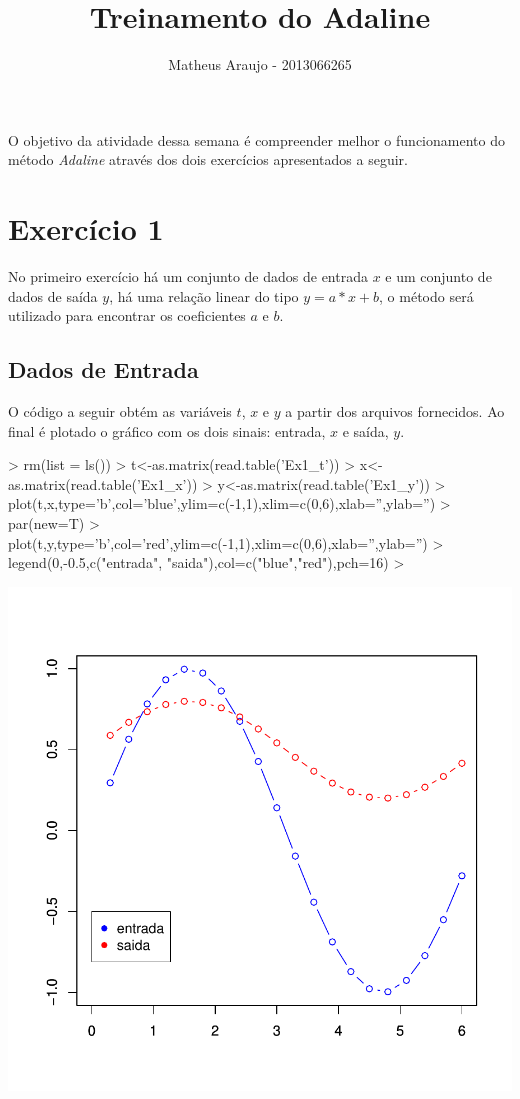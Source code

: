 \documentclass{article}
\begin{document}


\title{Treinamento do Adaline}
\author{Matheus Araujo - 2013066265}
\date{}

\maketitle

O objetivo da atividade dessa semana é compreender melhor o funcionamento do método \emph{Adaline} através dos dois exercícios apresentados a seguir.

\section{Exercício 1}

No primeiro exercício há um conjunto de dados de entrada $x$ e um conjunto de dados de saída $y$, há uma relação linear do tipo $y = a*x+b$, o método será utilizado para encontrar os coeficientes $a$ e $b$.

\subsection{Dados de Entrada}

O código a seguir obtém as variáveis $t$, $x$ e $y$ a partir dos arquivos fornecidos. Ao final é plotado o gráfico com os dois sinais: entrada, $x$ e saída, $y$.

\begin{Schunk}
\begin{Sinput}
>   rm(list = ls())
>   t<-as.matrix(read.table('Ex1_t'))
>   x<-as.matrix(read.table('Ex1_x'))
>   y<-as.matrix(read.table('Ex1_y'))
>   plot(t,x,type='b',col='blue',ylim=c(-1,1),xlim=c(0,6),xlab='',ylab='')
>   par(new=T)
>   plot(t,y,type='b',col='red',ylim=c(-1,1),xlim=c(0,6),xlab='',ylab='')
>   legend(0,-0.5,c("entrada", "saida"),col=c("blue","red"),pch=16)
> 
\end{Sinput}
\end{Schunk}
\includegraphics{adaline-001}
\end{document}
